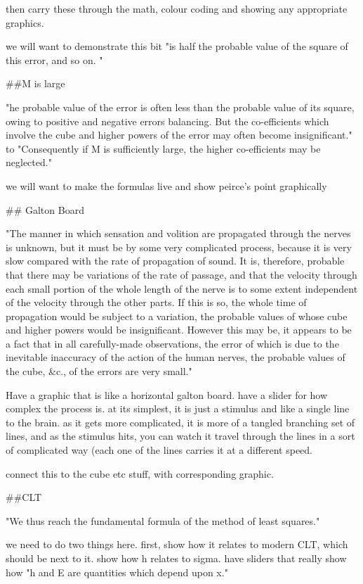 then carry these through the math, colour coding and showing any appropriate graphics. 

we will want to demonstrate this bit "is half the probable value of the square of this error, and so on. "


##M is large

"he probable value of the error is often less than the probable value of its square, owing to positive and negative errors balancing. But the co-efficients which involve the cube and higher powers of the error may often become insignificant." to "Consequently if M is sufficiently large, the higher co-efficients may be neglected."

we will want to make the formulas live and show peirce's point graphically




## Galton Board

"The manner in which sensation and volition are propagated through the nerves is unknown, but it must be by some very complicated process, because it is very slow compared with the rate of propagation of sound. It is, therefore, probable that there may be variations of the rate of passage, and that the velocity through each small portion of the whole length of the nerve is to some extent independent of the velocity through the other parts. If this is so, the whole time of propagation would be subject to a variation, the probable values of whose cube and higher powers would be insignificant. However this may be, it appears to be a fact that in all carefully-made observations, the error of which is due to the inevitable inaccuracy of the action of the human nerves, the probable values of the cube, &c., of the errors are very small."

Have a graphic that is like a horizontal galton board. have a slider for how complex the process is. at its simplest, it is just a stimulus and like a single line to the brain. as it gets more complicated, it is more of a tangled branching set of lines, and as the stimulus hits, you can watch it travel through the lines in a sort of complicated way (each one of the lines carries it at a different speed. 

connect this to the cube etc stuff, with corresponding graphic. 


##CLT

"We thus reach the fundamental formula of the method of least squares."

we need to do two things here. first, show how it relates to modern CLT, which should be next to it.  show how h relates to sigma. have sliders that really show how "h and E are quantities which depend upon x."


